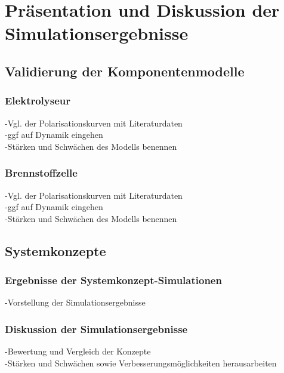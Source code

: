 \chapter{Präsentation und Diskussion der Simulationsergebnisse}
\label{cha:Diskussion}

\section{Validierung der Komponentenmodelle}
\label{sec:Sektion 1}

\subsection{Elektrolyseur}
-Vgl. der Polarisationskurven mit  Literaturdaten\\
-ggf auf Dynamik eingehen\\
-Stärken und Schwächen des Modells benennen\\

\subsection{Brennstoffzelle}
-Vgl. der Polarisationskurven mit  Literaturdaten\\
-ggf auf Dynamik eingehen\\
-Stärken und Schwächen des Modells benennen\\

\section{Systemkonzepte}

\subsection{Ergebnisse der Systemkonzept-Simulationen}
-Vorstellung der Simulationsergebnisse\\
\subsection{Diskussion der Simulationsergebnisse}
-Bewertung und Vergleich der Konzepte\\
-Stärken und Schwächen sowie Verbesserungsmöglichkeiten herausarbeiten\\